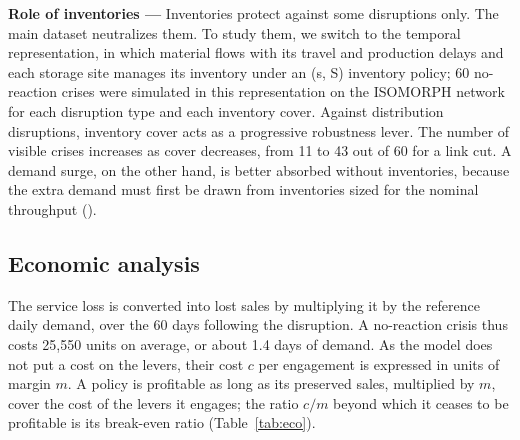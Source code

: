 \begin{center}
\begin{minipage}{\textwidth}\centering

\label{fig:carte}
\end{minipage}
\end{center}

\label{sec:4.4}

\textbf{Role of inventories — }Inventories protect against some disruptions only. The main dataset neutralizes them. To study them, we switch to the temporal representation, in which material flows with its travel and production delays and each storage site manages its inventory under an (s, S) inventory policy; 60 no-reaction crises were simulated in this representation on the ISOMORPH network for each disruption type and each inventory cover. Against distribution disruptions, inventory cover acts as a progressive robustness lever. The number of visible crises increases as cover decreases, from 11 to 43 out of 60 for a link cut. A demand surge, on the other hand, is better absorbed without inventories, because the extra demand must first be drawn from inventories sized for the nominal throughput ().

\subsection{Economic analysis}
\label{sec:4.5}

The service loss is converted into lost sales by multiplying it by the reference daily demand, over the 60 days following the disruption. A no-reaction crisis thus costs 25,550 units on average, or about 1.4 days of demand. As the model does not put a cost on the levers, their cost $c$ per engagement is expressed in units of margin $m$. A policy is profitable as long as its preserved sales, multiplied by $m$, cover the cost of the levers it engages; the ratio $c/m$ beyond which it ceases to be profitable is its break-even ratio (Table~\ref{tab:eco}).

